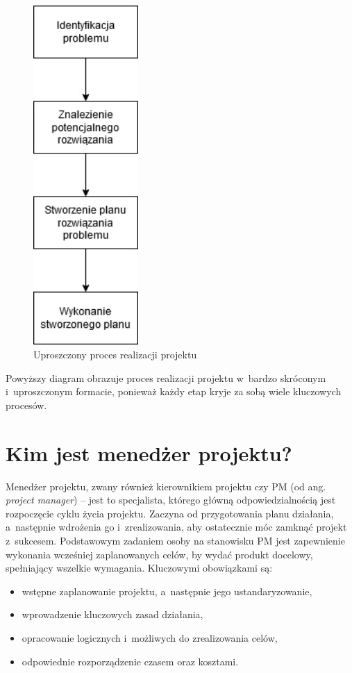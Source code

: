 \documentclass[oneside,polski,logo]{amuthesis}
\begin{document}
\begin{figure}[h]
	\centering
	\includegraphics[width=4cm]{images/hyps/diagram-zarzadzania-projektem.png}
	\caption{Uproszczony proces realizacji projektu}
\end{figure}

Powyższy diagram obrazuje proces realizacji projektu w~bardzo skróconym i~uproszczonym formacie, ponieważ każdy etap kryje za sobą wiele kluczowych procesów.

\section {Kim jest menedżer projektu?}
Menedżer projektu, zwany również kierownikiem projektu czy PM (od ang. \emph{project manager}) – jest to specjalista, którego główną odpowiedzialnością jest rozpoczęcie cyklu życia projektu. Zaczyna od przygotowania planu działania, a~następnie wdrożenia go i~zrealizowania, aby ostatecznie móc zamknąć projekt z~sukcesem. Podstawowym zadaniem osoby na stanowisku PM jest zapewnienie wykonania wcześniej zaplanowanych celów, by wydać produkt docelowy, spełniający wszelkie wymagania. Kluczowymi obowiązkami są:

\begin{itemize}
	\item wstępne zaplanowanie projektu, a~następnie jego ustandaryzowanie,
	\item wprowadzenie kluczowych zasad działania,
	\item opracowanie logicznych i~możliwych do zrealizowania celów,
	\item odpowiednie rozporządzenie czasem oraz kosztami. \\
\end{itemize}
\end{document}
